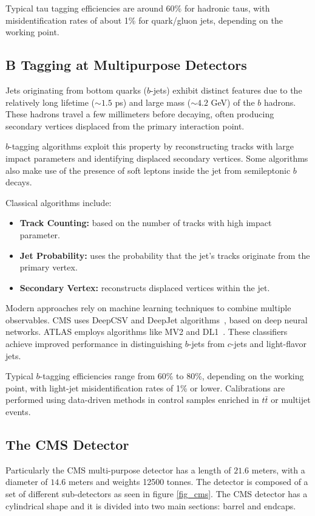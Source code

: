 Typical tau tagging efficiencies are around 60\% for hadronic taus, with misidentification rates of about 1\% for quark/gluon jets, depending on the working point.

\subsection{B Tagging at Multipurpose Detectors}

Jets originating from bottom quarks ($b$-jets) exhibit distinct features due to the relatively long lifetime ($\sim 1.5$ ps) and large mass ($\sim 4.2$ GeV) of the $b$ hadrons. These hadrons travel a few millimeters before decaying, often producing secondary vertices displaced from the primary interaction point.

$b$-tagging algorithms exploit this property by reconstructing tracks with large impact parameters and identifying displaced secondary vertices. Some algorithms also make use of the presence of soft leptons inside the jet from semileptonic $b$ decays.

Classical algorithms include:
\begin{itemize}
    \item \textbf{Track Counting:} based on the number of tracks with high impact parameter.
    \item \textbf{Jet Probability:} uses the probability that the jet’s tracks originate from the primary vertex.
    \item \textbf{Secondary Vertex:} reconstructs displaced vertices within the jet.
\end{itemize}

Modern approaches rely on machine learning techniques to combine multiple observables. CMS uses DeepCSV and DeepJet algorithms~\parencite{CMS:2017wtu}, based on deep neural networks. ATLAS employs algorithms like MV2 and DL1~\parencite{ATLAS:2019bwq}. These classifiers achieve improved performance in distinguishing $b$-jets from $c$-jets and light-flavor jets.

Typical $b$-tagging efficiencies range from 60\% to 80\%, depending on the working point, with light-jet misidentification rates of 1\% or lower. Calibrations are performed using data-driven methods in control samples enriched in $t\bar{t}$ or multijet events.

\subsection{The CMS Detector}
Particularly the CMS multi-purpose detector has a length of $21.6$ meters, with a diameter of $14.6$ meters and weights 12500 tonnes. The detector is composed of a set of different sub-detectors as seen in figure \ref{fig_cms}. The CMS detector has a cylindrical shape and it is divided into two main sections: barrel and endcaps. 

